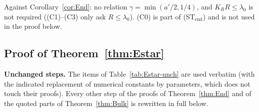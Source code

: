 Against Corollary~\ref{cor:End}: no relation $\gamma=\min(a'/2,1/4)$, and $K_RR\le\lambda_0$ is not required ((C1)--(C3) only
ask $R\le\lambda_0$). (C0) is part of \textup{(ST$_{\mathrm{end}}$)} and is not used in the proof below.

\subsection{Proof of Theorem~\ref{thm:Estar}}

\noindent\textbf{Unchanged steps.} The items of Table~\ref{tab:Estar-unch} are used verbatim (with the indicated replacement of
numerical constants by parameters, which does not touch their proofs). Every other step of the proofs of
Theorem~\ref{thm:End} and of the quoted parts of Theorem~\ref{thm:Bulk} is rewritten in full below.


